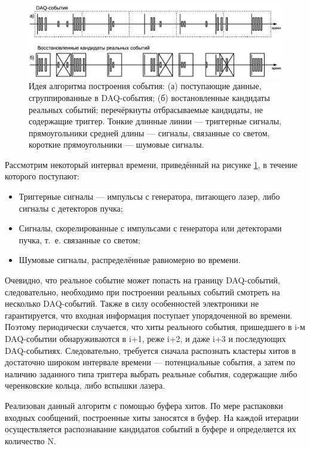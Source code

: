 \begin{figure}
\includegraphics[width=1.0\textwidth]{pictures/15_Event_building_rus_bw.eps}
\caption{Идея алгоритма построения события: (а) поступающие данные, сгруппированные в DAQ-события; (б) востановленные кандидаты реальных событий; перечёркнуты отбрасываемые кандидаты, не содержащие триггер. Тонкие длинные линии --- триггерные сигналы, прямоугольники средней длины --- сигналы, связанные со светом, короткие прямоугольники --- шумовые сигналы.}
\label{fig:EventBuilding}
\end{figure}

Рассмотрим некоторый интервал времени, приведённый на рисунке \ref{fig:EventBuilding}, в течение которого поступают:
\begin{itemize}
\item {Триггерные сигналы --- импульсы с генератора, питающего лазер, либо сигналы с детекторов пучка;}
\item {Сигналы, скорелированные с импульсами с генератора или детекторами пучка, т. е. связанные со светом;}
\item {Шумовые сигналы, распределённые равномерно во времени.}
\end{itemize}

Очевидно, что реальное событие может попасть на границу DAQ-событий, следовательно, необходимо при построении реальных событий смотреть на несколько DAQ-событий. Также в силу особенностей электроники не гарантируется, что входная информация поступает упорядоченной во времени. Поэтому периодически случается, что хиты реального события, пришедшего в i-м DAQ-событии обнаруживаются в i+1, реже i+2, и даже i+3 и последующих DAQ-событиях. Следовательно, требуется сначала распознать кластеры хитов в достаточно широком интервале времени --- потенциальные события, а затем по наличию заданного типа триггера выбрать реальные события, содержащие либо черенковские кольца, либо вспышки лазера.

Реализован данный алгоритм с помощью буфера хитов. По мере распаковки входных сообщений, построенные хиты заносятся в буфер. На каждой итерации осуществляется распознавание кандидатов событий в буфере и определяется их количество N.

